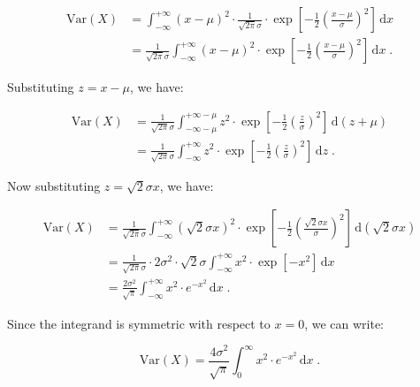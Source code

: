 \documentclass[a4paper,12pt,twoside]{book}
\begin{document}
\begin{equation} \label{eq:norm-var-norm-var-s1}
\begin{split}
\mathrm{Var}(X) &= \int_{-\infty}^{+\infty} (x - \mu)^2 \cdot \frac{1}{\sqrt{2 \pi} \sigma} \cdot \exp \left[ -\frac{1}{2} \left( \frac{x-\mu}{\sigma} \right)^2 \right] \, \mathrm{d}x \\
&= \frac{1}{\sqrt{2 \pi} \sigma} \int_{-\infty}^{+\infty} (x - \mu)^2 \cdot \exp \left[ -\frac{1}{2} \left( \frac{x-\mu}{\sigma} \right)^2 \right] \, \mathrm{d}x \; .
\end{split}
\end{equation}

Substituting $z = x -\mu$, we have:

\begin{equation} \label{eq:norm-var-norm-var-s2}
\begin{split}
\mathrm{Var}(X) &= \frac{1}{\sqrt{2 \pi} \sigma} \int_{-\infty-\mu}^{+\infty-\mu} z^2 \cdot \exp \left[ -\frac{1}{2} \left( \frac{z}{\sigma} \right)^2 \right] \, \mathrm{d}(z + \mu) \\
&= \frac{1}{\sqrt{2 \pi} \sigma} \int_{-\infty}^{+\infty} z^2 \cdot \exp \left[ -\frac{1}{2} \left( \frac{z}{\sigma} \right)^2 \right] \, \mathrm{d}z \; .
\end{split}
\end{equation}

Now substituting $z = \sqrt{2} \sigma x$, we have:

\begin{equation} \label{eq:norm-var-norm-var-s3}
\begin{split}
\mathrm{Var}(X) &= \frac{1}{\sqrt{2 \pi} \sigma} \int_{-\infty}^{+\infty} (\sqrt{2} \sigma x)^2 \cdot \exp \left[ -\frac{1}{2} \left( \frac{\sqrt{2} \sigma x}{\sigma} \right)^2 \right] \, \mathrm{d}(\sqrt{2} \sigma x) \\
&= \frac{1}{\sqrt{2 \pi} \sigma} \cdot 2 \sigma^2 \cdot \sqrt{2} \sigma \int_{-\infty}^{+\infty} x^2 \cdot \exp \left[ -x^2 \right] \, \mathrm{d}x \\
&= \frac{2 \sigma^2}{\sqrt{\pi}} \int_{-\infty}^{+\infty} x^2 \cdot e^{-x^2} \, \mathrm{d}x \; .
\end{split}
\end{equation}

Since the integrand is symmetric with respect to $x = 0$, we can write:

\begin{equation} \label{eq:norm-var-norm-var-s4}
\mathrm{Var}(X) = \frac{4 \sigma^2}{\sqrt{\pi}} \int_{0}^{\infty} x^2 \cdot e^{-x^2} \, \mathrm{d}x \; .
\end{equation}
\end{document}
